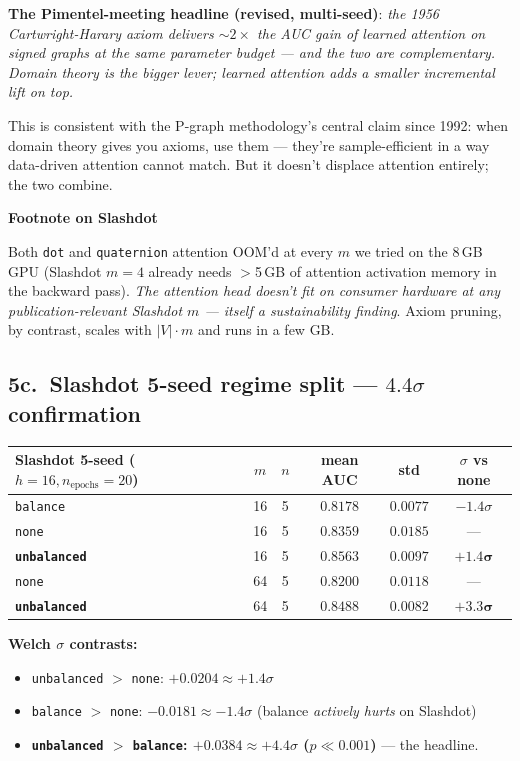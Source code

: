 \documentclass[11pt,a4paper]{article}
\newcommand{\code}[1]{\texttt{\small #1}}
\newcommand{\sect}[1]{\par\medskip\noindent\textbf{\color{deepblue}#1}\par\nopagebreak}
\begin{document}
\textbf{The Pimentel-meeting headline (revised, multi-seed)}:
\emph{the 1956 Cartwright-Harary axiom delivers $\sim 2\times$ the
AUC gain of learned attention on signed graphs at the same
parameter budget --- and the two are complementary. Domain theory
is the bigger lever; learned attention adds a smaller incremental
lift on top.}

This is consistent with the P-graph methodology's central claim
since 1992: when domain theory gives you axioms, use them ---
they're sample-efficient in a way data-driven attention cannot
match. But it doesn't displace attention entirely; the two combine.

\sect{Footnote on Slashdot}
Both \code{dot} and \code{quaternion} attention OOM'd at every $m$
we tried on the 8\,GB GPU (Slashdot $m{=}4$ already needs $>$5\,GB
of attention activation memory in the backward pass). \emph{The
attention head doesn't fit on consumer hardware at any
publication-relevant Slashdot $m$ --- itself a sustainability
finding}. Axiom pruning, by contrast, scales with $|V| \cdot m$ and
runs in a few GB.

\subsection*{5c.\ Slashdot 5-seed regime split --- $4.4\sigma$ confirmation}

\begin{center}
\begin{tabular}{l c c c c c}
\toprule
Slashdot 5-seed ($h{=}16, n_\text{epochs}{=}20$) & $m$ & $n$ & mean AUC & std & $\sigma$ vs none \\
\midrule
\code{balance}    & 16 & 5 & $0.8178$           & $0.0077$ & $-1.4\sigma$ \\
\code{none}       & 16 & 5 & $0.8359$           & $0.0185$ & --- \\
\textbf{\code{unbalanced}} & 16 & 5 & $\mathbf{0.8563}$  & $0.0097$ & $\mathbf{+1.4\sigma}$ \\
\midrule
\code{none}       & 64 & 5 & $0.8200$           & $0.0118$ & --- \\
\textbf{\code{unbalanced}} & 64 & 5 & $0.8488$  & $0.0082$ & $\mathbf{+3.3\sigma}$ \\
\bottomrule
\end{tabular}
\end{center}

\textbf{Welch $\sigma$ contrasts:}
\begin{itemize}
\item \code{unbalanced} $>$ \code{none}:    $+0.0204 \approx +1.4\sigma$
\item \code{balance} $>$ \code{none}:       $-0.0181 \approx -1.4\sigma$
      (balance \emph{actively hurts} on Slashdot)
\item \textbf{\code{unbalanced} $>$ \code{balance}: $+0.0384 \approx +4.4\sigma$
      ($p \ll 0.001$)} --- the headline.
\end{itemize}
\end{document}
